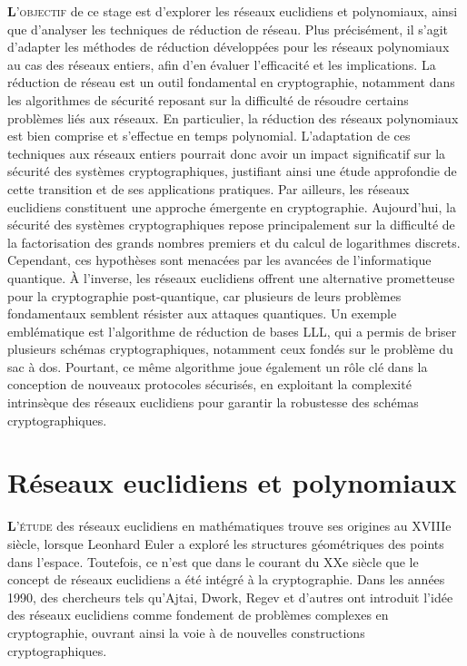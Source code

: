 \documentclass[a4paper,12pt]{report}  %
\theoremstyle{definitionstyle}
\theoremstyle{examplestyle}
\theoremstyle{remarkstyle}
\theoremstyle{propositionstyle}
\theoremstyle{theoremstyle}
\theoremstyle{proofstyle}
\begin{document}
\begin{justify}
	\lettrine{\textbf{L}}{'objectif} de ce stage est d'explorer les réseaux euclidiens et polynomiaux, ainsi que d'analyser les techniques de réduction de réseau. Plus précisément, il s'agit d'adapter les méthodes de réduction développées pour les réseaux polynomiaux au cas des réseaux entiers, afin d'en évaluer l'efficacité et les implications. La réduction de réseau est un outil fondamental en cryptographie, notamment dans les algorithmes de sécurité reposant sur la difficulté de résoudre certains problèmes liés aux réseaux. En particulier, la réduction des réseaux polynomiaux est bien comprise et s'effectue en temps polynomial. L'adaptation de ces techniques aux réseaux entiers pourrait donc avoir un impact significatif sur la sécurité des systèmes cryptographiques, justifiant ainsi une étude approfondie de cette transition et de ses applications pratiques. Par ailleurs, les réseaux euclidiens constituent une approche émergente en cryptographie. Aujourd’hui, la sécurité des systèmes cryptographiques repose principalement sur la difficulté de la factorisation des grands nombres premiers et du calcul de logarithmes discrets. Cependant, ces hypothèses sont menacées par les avancées de l’informatique quantique. À l’inverse, les réseaux euclidiens offrent une alternative prometteuse pour la cryptographie post-quantique, car plusieurs de leurs problèmes fondamentaux semblent résister aux attaques quantiques. Un exemple emblématique est l’algorithme de réduction de bases LLL, qui a permis de briser plusieurs schémas cryptographiques, notamment ceux fondés sur le problème du sac à dos. Pourtant, ce même algorithme joue également un rôle clé dans la conception de nouveaux protocoles sécurisés, en exploitant la complexité intrinsèque des réseaux euclidiens pour garantir la robustesse des schémas cryptographiques.
\end{justify}
	
	
\chapter{Réseaux euclidiens et polynomiaux}

\lettrine{\textbf{L}}{'étude} des réseaux euclidiens en mathématiques trouve ses origines au XVIIIe siècle, lorsque Leonhard Euler a exploré les structures géométriques des points dans l'espace. Toutefois, ce n'est que dans le courant du XXe siècle que le concept de réseaux euclidiens a été intégré à la cryptographie. Dans les années 1990, des chercheurs tels qu'Ajtai, Dwork, Regev et d'autres ont introduit l'idée des réseaux euclidiens comme fondement de problèmes complexes en cryptographie, ouvrant ainsi la voie à de nouvelles constructions cryptographiques.
	
\end{document}
